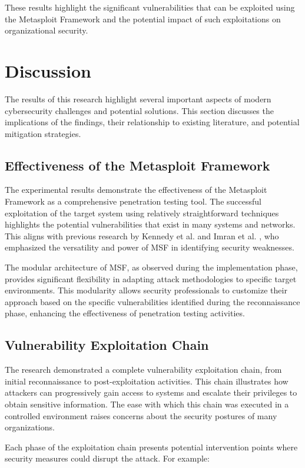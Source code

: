 \documentclass[journal,twoside]{IEEEtran}
\begin{document}
These results highlight the significant vulnerabilities that can be exploited using the Metasploit Framework and the potential impact of such exploitations on organizational security.

\section{Discussion}
The results of this research highlight several important aspects of modern cybersecurity challenges and potential solutions. This section discusses the implications of the findings, their relationship to existing literature, and potential mitigation strategies.

\subsection{Effectiveness of the Metasploit Framework}
The experimental results demonstrate the effectiveness of the Metasploit Framework as a comprehensive penetration testing tool. The successful exploitation of the target system using relatively straightforward techniques highlights the potential vulnerabilities that exist in many systems and networks. This aligns with previous research by Kennedy et al. \cite{kennedy2011} and Imran et al. \cite{imran2019}, who emphasized the versatility and power of MSF in identifying security weaknesses.

The modular architecture of MSF, as observed during the implementation phase, provides significant flexibility in adapting attack methodologies to specific target environments. This modularity allows security professionals to customize their approach based on the specific vulnerabilities identified during the reconnaissance phase, enhancing the effectiveness of penetration testing activities.

\subsection{Vulnerability Exploitation Chain}
The research demonstrated a complete vulnerability exploitation chain, from initial reconnaissance to post-exploitation activities. This chain illustrates how attackers can progressively gain access to systems and escalate their privileges to obtain sensitive information. The ease with which this chain was executed in a controlled environment raises concerns about the security postures of many organizations.

Each phase of the exploitation chain presents potential intervention points where security measures could disrupt the attack. For example:
\end{document}
